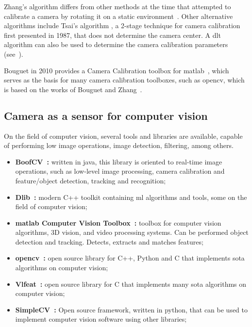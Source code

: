 Zhang's algorithm differs from other methods at the time that attempted to calibrate a camera by rotating it on a static environment~\citeneeded. Other alternative algorithms include Tsai's algorithm \cite{Roger1987, mvg_book}, a 2-stage technique for camera calibration first presented in 1987, that does not determine the camera center. A \ac{dlt} algorithm can also be used to determine the camera calibration parameters (see~\cite{mvg_book}).

Bouguet in 2010 provides a Camera Calibration toolbox for \ac{matlab}~\cite{Bouguet2010}, which serves as the basis for many camera calibration toolboxes, such as \ac{opencv}, which is based on the works of Bouguet and Zhang~\cite{opencv}.


\subsection{Camera as a sensor for computer vision}
On the field of computer vision, several tools and libraries are available, capable of performing low image operations, image detection, filtering, among others. 

\begin{itemize}
	\item \textbf{BoofCV~\cite{boofcv}:} written in java, this library is oriented to real-time image operations, such as low-level image processing, camera calibration and feature/object  detection, tracking and recognition;
	\item \textbf{Dlib~\cite{dlib}:} modern C++ toolkit containing \acl{ml} algorithms and tools, some on the field of computer vision;
	\item \textbf{\ac{matlab} Computer Vision Toolbox\texttrademark~\cite{matlabcvtoolbox}:} toolbox for computer vision algorithms, 3D vision, and video processing systems. Can be performed object detection and tracking. Detects, extracts and matches features;
	\item \textbf{\acf{opencv}~\cite{opencv}:} open source library for C++, Python and C that implements \acl{sota} algorithms on computer vision;
	\item \textbf{Vlfeat~\cite{vlfeat}:} open source library for C that implements many \acl{sota} algorithms on computer vision;
	\item \textbf{SimpleCV~\cite{simplecv}:} Open source framework, written in python, that can be used to implement computer vision software using other libraries;
\end{itemize}

